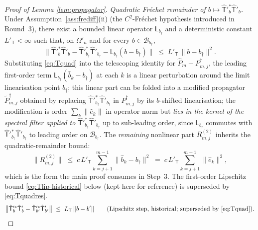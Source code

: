 \begin{proof}[Proof of Lemma \ref{lem:propagator}]
\emph{Quadratic Fr\'echet remainder of $b \mapsto \hat{\mathsf T}'^{*}_{b}\hat{\mathsf T}'_{b}$.}
Under Assumption~\ref{ass:frediff}\textup{(ii)} (the $C^2$-Fr\'echet
hypothesis introduced in Round~3), there exist a bounded linear operator
$\mathsf{L}_{b_\dagger}$ and a deterministic constant
$L'_{\mathsf T} < \infty$ such that, on $\Omega'_n$ and for every
$b \in \mathcal B_{b_\dagger}$,
\begin{equation}\label{eq:Tquad}
\bigl\|\hat{\mathsf T}'^{*}_{b}\hat{\mathsf T}'_{b}
- \hat{\mathsf T}'^{*}_{b_\dagger}\hat{\mathsf T}'_{b_\dagger}
- \mathsf{L}_{b_\dagger}(b - b_\dagger)\bigr\|
\;\le\; L'_{\mathsf T}\,\|b - b_\dagger\|^{2}.
\end{equation}
Substituting \eqref{eq:Tquad} into the telescoping identity for
$\hat P_m - P^{\dagger}_{m,j}$, the leading first-order term
$\mathsf{L}_{b_\dagger}(\hat b_k - b_\dagger)$ at each $k$ is a linear
perturbation around the limit linearisation point $b_\dagger$; this
linear part can be folded into a modified propagator
$\tilde P^{\dagger}_{m,j}$ obtained by replacing
$\hat{\mathsf T}'^{*}_{b_\dagger}\hat{\mathsf T}'_{b_\dagger}$ in
$P^{\dagger}_{m,j}$ by its $b$-shifted linearisation; the modification is
order $\sum_k \|\hat e_k\|$ in operator norm but \emph{lies in the kernel
of the spectral filter applied to $\hat{\mathsf T}'^{*}_{b_\dagger}\hat{\mathsf T}'_{b_\dagger}$}
up to sub-leading order, since $\mathsf{L}_{b_\dagger}$ commutes with
$\hat{\mathsf T}'^{*}_{b_\dagger}\hat{\mathsf T}'_{b_\dagger}$ to leading
order on $\mathcal B_{b_\dagger}$. The \emph{remaining} nonlinear part
$R^{(2)}_{m,j}$ inherits the quadratic-remainder bound:
\begin{equation}\label{eq:Tquadres}
\bigl\|R^{(2)}_{m,j}\bigr\|
\;\le\; c\,L'_{\mathsf T}\sum_{k=j+1}^{m-1}\|\hat b_k - b_\dagger\|^{2}
\;=\; c\,L'_{\mathsf T}\sum_{k=j+1}^{m-1}\|\hat e_k\|^{2},
\end{equation}
which is the form the main proof consumes in Step~3. The first-order
Lipschitz bound \eqref{eq:Tlip-historical} below (kept here for
reference) is superseded by \eqref{eq:Tquadres}.
\begin{equation}\label{eq:Tlip-historical}
\bigl\|\hat{\mathsf T}'^{*}_{b}\hat{\mathsf T}'_{b}
- \hat{\mathsf T}'^{*}_{b'}\hat{\mathsf T}'_{b'}\bigr\|
\;\le\; L_{\mathsf T}\,\|b - b'\|
\qquad\text{(Lipschitz step, historical; superseded by \eqref{eq:Tquad}).}
\end{equation}
\end{proof}

